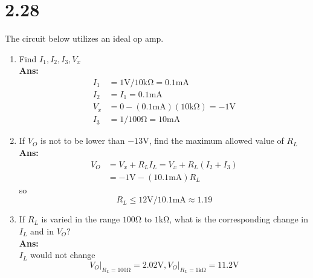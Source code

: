 \documentclass[12pt, a4paper]{article}
\newcommand{\smia}{\si{\milli\ampere}}
\newcommand{\svol}{\si{\volt}}
\newcommand{\sohm}{\si{\ohm}}
\newcommand{\skom}{\si{\kilo\ohm}}
\newcommand{\Ans}{{\\ \bf Ans:} \\}
\begin{document}
\section{2.28}
The circuit below utilizes an ideal op amp.\\
\begin{figure}[H]
\centering
{}
\end{figure}
\begin{enumerate}[label=(\alph*)]
  \item Find $I_1, I_2, I_3, V_x$
    \Ans 
    \begin{align*}
      I_1 &= 1\si{\volt} / 10\si{\kilo\ohm} = 0.1\si{\milli\ampere}\\
      I_2 &= I_1 = 0.1\si{\milli\ampere}\\
      V_x &= 0 - (0.1\si{\milli\ampere})(10\si{\kilo\ohm}) = -1 \si{\volt}\\
      I_3 &= 1 / 100\si{\ohm} = 10\si{\milli\ampere}
    \end{align*}
  \item If $V_O$ is not to be lower than $-13\si{\volt}$, find the maximum allowed value of $R_L$
    \Ans 
    \begin{align*}
      V_O &= V_x + R_L I_L = V_x + R_L (I_2 + I_3)\\
          &= - 1\si{\volt} - (10.1 \smia) R_L
    \end{align*}
    so
    \[
      R_L \leq 12\svol / 10.1 \smia \approx 1.19
    \]
  \item If $R_L$ is varied in the range $100 \sohm$ to $1 \si{\kilo\ohm}$, what is the corresponding change in $I_L$ and in $V_O$?
    \Ans
    $I_L$ would not change\\
    \[
      V_O \rvert_{R_L = 100 \sohm} = 2.02 \svol, V_O \rvert_{R_L = 1\skom} = 11.2\svol
    \]
\end{enumerate}
\end{document}
